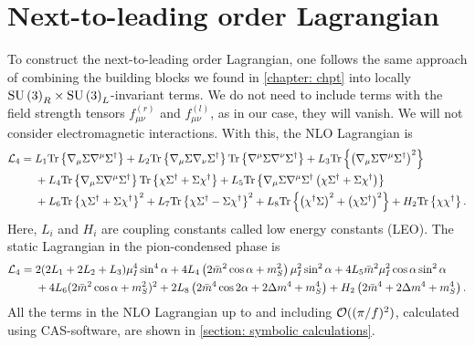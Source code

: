 \section{Next-to-leading order Lagrangian}
\label{section: nlo chpt}


To construct the next-to-leading order Lagrangian, one follows the same approach of combining the building blocks we found in \autoref{chapter: chpt} into locally $\text{SU}\left(3\right)_R\times\text{SU}\left(3\right)_L$-invariant terms.
We do not need to include terms with the field strength tensors $f_{\mu\nu}^{(r)}$ and $f_{\mu\nu}^{(l)}$, as in our case, they will vanish.
We will not consider electromagnetic interactions.
With this, the NLO Lagrangian is~\autocite{gasserChiralPerturbationTheory1985}
%
\begin{align}
    \label{NLO Lagrangian three flavor}
    \nonumber
    \mathcal{L}_4 
    ={} &
    L_1\text{Tr} \left\{ \nabla_\mu \Sigma \nabla^\mu \Sigma^\dagger \right\}
    + L_2 \text{Tr} \left\{ \nabla_\mu \Sigma \nabla_\nu \Sigma^\dagger \right\} 
    \text{Tr} \left\{ \nabla^\mu \Sigma \nabla^\nu \Sigma^\dagger \right\}
    + L_3 \text{Tr} \left\{ \left(\nabla_\mu \Sigma \nabla^\mu \Sigma^\dagger\right)^2 \right\} \\ \nonumber
    & + L_4 \text{Tr} \left\{ \nabla_\mu \Sigma \nabla^\mu \Sigma^\dagger \right\} 
    \text{Tr} \left\{ \chi \Sigma^\dagger + \Sigma \chi^\dagger \right\}
    + L_5 \text{Tr} \left\{ 
        \nabla_\mu \Sigma \nabla^\mu \Sigma^\dagger 
        \left(\chi \Sigma^\dagger + \Sigma \chi^\dagger\right)
     \right\}\\
    &+ L_6 \text{Tr} \left\{ \chi \Sigma^\dagger + \Sigma \chi^\dagger \right\}^2 
     + L_7 \text{Tr} \left\{ \chi \Sigma^\dagger - \Sigma \chi^\dagger \right\}^2
    + L_8 \text{Tr} \left\{  \left(\chi^\dagger \Sigma \right)^2 + \left(\chi \Sigma^\dagger \right)^2 \right\}
    + H_2 \text{Tr} \left\{ \chi \chi^\dagger \right\}.
\end{align}
%
Here, $L_i$ and $H_i$ are coupling constants called low energy constants (LEO).
The static Lagrangian in the pion-condensed phase is
%
\begin{align}
    \nonumber
    \mathcal{L}_4
    = {}&
    2(2L_1 + 2L_2 + L_3) \mu_I^4 \sin^4\alpha
    + 4  L_4 \left( 2 \bar m^2 \cos\alpha + m_S^2 \right) \mu_I^2\sin^2\alpha
    + 4 L_5 \bar m^2 \mu_I^2 \cos\alpha \sin^2 \alpha 
    \\ & 
    + 4 L_6 (2\bar m^2\cos\alpha + m_S^2)^2
    + 2 L_8 \left(2 \bar m^4 \cos2\alpha + 2 \Delta m^4 + m_S^4\right)
    + H_2 \left(2\bar m^4 + 2\Delta m^4 + m_S^4 \right).
\end{align}
%
All the terms in the NLO Lagrangian up to and including $\mathcal O((\pi/f)^2)$, calculated using CAS-software, are shown in \autoref{section: symbolic calculations}.

